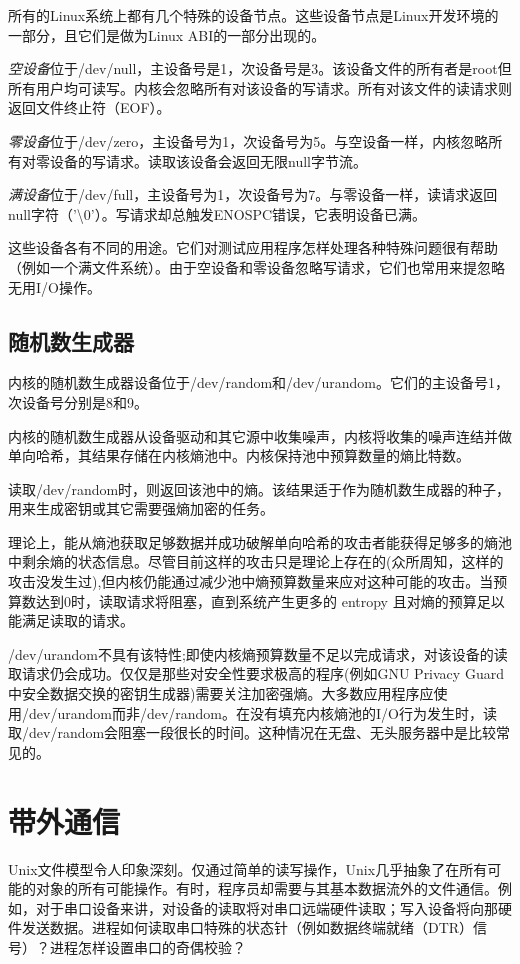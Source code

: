 所有的Linux系统上都有几个特殊的设备节点。这些设备节点是Linux开发环境的一部分，且它们是做为Linux ABI的一部分出现的。

\emph{空设备}位于/dev/null，主设备号是1，次设备号是3。该设备文件的所有者是root但所有用户均可读写。内核会忽略所有对该设备的写请求。所有对该文件的读请求则返回文件终止符（EOF）。

\emph{零设备}位于/dev/zero，主设备号为1，次设备号为5。与空设备一样，内核忽略所有对零设备的写请求。读取该设备会返回无限null字节流。

\emph{满设备}位于/dev/full，主设备号为1，次设备号为7。与零设备一样，读请求返回null字符（'\textbackslash0'）。写请求却总触发ENOSPC错误，它表明设备已满。

这些设备各有不同的用途。它们对测试应用程序怎样处理各种特殊问题很有帮助（例如一个满文件系统）。由于空设备和零设备忽略写请求，它们也常用来提忽略无用I/O操作。

\subsection{随机数生成器} 

内核的随机数生成器设备位于/dev/random和/dev/urandom。它们的主设备号1，次设备号分别是8和9。

内核的随机数生成器从设备驱动和其它源中收集噪声，内核将收集的噪声连结并做单向哈希，其结果存储在内核熵池中。内核保持池中预算数量的熵比特数。

读取/dev/random时，则返回该池中的熵。该结果适于作为随机数生成器的种子，用来生成密钥或其它需要强熵加密的任务。

理论上，能从熵池获取足够数据并成功破解单向哈希的攻击者能获得足够多的熵池中剩余熵的状态信息。尽管目前这样的攻击只是理论上存在的(众所周知，这样的攻击没发生过),但内核仍能通过减少池中熵预算数量来应对这种可能的攻击。当预算数达到0时，读取请求将阻塞，直到系统产生更多的 entropy 且对熵的预算足以能满足读取的请求。

/dev/urandom不具有该特性;即使内核熵预算数量不足以完成请求，对该设备的读取请求仍会成功。仅仅是那些对安全性要求极高的程序(例如GNU Privacy Guard中安全数据交换的密钥生成器)需要关注加密强熵。大多数应用程序应使用/dev/urandom而非/dev/random。在没有填充内核熵池的I/O行为发生时，读取/dev/random会阻塞一段很长的时间。这种情况在无盘、无头服务器中是比较常见的。

\section{带外通信}

Unix文件模型令人印象深刻。仅通过简单的读写操作，Unix几乎抽象了在所有可能的对象的所有可能操作。有时，程序员却需要与其基本数据流外的文件通信。例如，对于串口设备来讲，对设备的读取将对串口远端硬件读取；写入设备将向那硬件发送数据。进程如何读取串口特殊的状态针（例如数据终端就绪（DTR）信号）？进程怎样设置串口的奇偶校验？


